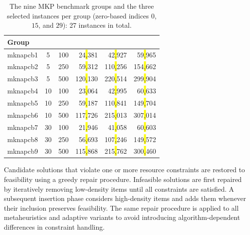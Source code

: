 \documentclass[mathematics,article,accept,moreauthors]{Definitions/mdpi}
\begin{document}
\begin{table}[H]
\small
\caption{The nine MKP benchmark groups and the three selected instances per
group (zero-based indices $0$, $15$, and $29$): 27 instances in total.}
\label{tab:instances}
\begin{tabularx}{\textwidth}{LCCRRR}
\toprule
\textbf{Group} & \textbf{} & \textbf{} &
\textbf{} & \textbf{} & \textbf{} \\
\midrule
mknapcb1 & 5 & 100 & 24\hl{,}381 %
 & 42\hl{,}927 & 59\hl{,}965 \\
mknapcb2 & 5 & 250 & 59\hl{,}312 & 110\hl{,}256 & 154\hl{,}662 \\
mknapcb3 & 5 & 500 & 120\hl{,}130 & 220\hl{,}514 & 299\hl{,}904 \\
mknapcb4 & 10 & 100 & 23\hl{,}064 & 42\hl{,}995 & 60\hl{,}633 \\
mknapcb5 & 10 & 250 & 59\hl{,}187 & 110\hl{,}841 & 149\hl{,}704 \\
mknapcb6 & 10 & 500 & 117\hl{,}726 & 215\hl{,}013 & 307\hl{,}014 \\
mknapcb7 & 30 & 100 & 21\hl{,}946 & 41\hl{,}058 & 60\hl{,}603 \\
mknapcb8 & 30 & 250 & 56\hl{,}693 & 107\hl{,}246 & 149\hl{,}572 \\
mknapcb9 & 30 & 500 & 115\hl{,}868 & 215\hl{,}762 & 300\hl{,}460 \\
\bottomrule
\end{tabularx}
\end{table}

Candidate solutions that violate one or more resource constraints are
restored to feasibility using a greedy repair procedure. Infeasible
solutions are first repaired by iteratively removing low-density items until
all constraints are satisfied. A subsequent insertion phase considers
high-density items and adds them whenever their inclusion preserves
feasibility. The same repair procedure is applied to all metaheuristics and
adaptive variants to avoid introducing algorithm-dependent differences in
constraint handling.


\subsubsection*{ %
}
\label{sec:mh_config}
\end{document}
